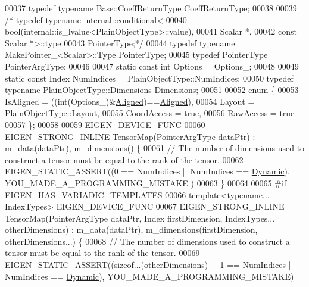 \begin{DoxyCode}
00037     \textcolor{keyword}{typedef} \textcolor{keyword}{typename} Base::CoeffReturnType CoeffReturnType;
00038 
00039   \textcolor{comment}{/*    typedef typename internal::conditional<}
00040 \textcolor{comment}{                         bool(internal::is\_lvalue<PlainObjectType>::value),}
00041 \textcolor{comment}{                         Scalar *,}
00042 \textcolor{comment}{                         const Scalar *>::type}
00043 \textcolor{comment}{                     PointerType;*/}
00044     \textcolor{keyword}{typedef} \textcolor{keyword}{typename} MakePointer\_<Scalar>::Type PointerType;
00045     \textcolor{keyword}{typedef} PointerType PointerArgType;
00046 
00047     \textcolor{keyword}{static} \textcolor{keyword}{const} \textcolor{keywordtype}{int} Options = Options\_;
00048 
00049     \textcolor{keyword}{static} \textcolor{keyword}{const} Index NumIndices = PlainObjectType::NumIndices;
00050     \textcolor{keyword}{typedef} \textcolor{keyword}{typename} PlainObjectType::Dimensions Dimensions;
00051 
00052     \textcolor{keyword}{enum} \{
00053       IsAligned = ((int(Options\_)&\hyperlink{group__enums_gga45fe06e29902b7a2773de05ba27b47a1ad37d4c71425bb286e9b4103830538fbf}{Aligned})==\hyperlink{group__enums_gga45fe06e29902b7a2773de05ba27b47a1ad37d4c71425bb286e9b4103830538fbf}{Aligned}),
00054       Layout = PlainObjectType::Layout,
00055       CoordAccess = \textcolor{keyword}{true},
00056       RawAccess = \textcolor{keyword}{true}
00057     \};
00058 
00059     EIGEN\_DEVICE\_FUNC
00060     EIGEN\_STRONG\_INLINE TensorMap(PointerArgType dataPtr) : m\_data(dataPtr), m\_dimensions() \{
00061       \textcolor{comment}{// The number of dimensions used to construct a tensor must be equal to the rank of the tensor.}
00062       EIGEN\_STATIC\_ASSERT((0 == NumIndices || NumIndices == \hyperlink{namespace_eigen_ad81fa7195215a0ce30017dfac309f0b2}{Dynamic}), YOU\_MADE\_A\_PROGRAMMING\_MISTAKE
      )
00063     \}
00064 
00065 \textcolor{preprocessor}{#if EIGEN\_HAS\_VARIADIC\_TEMPLATES}
00066     \textcolor{keyword}{template}<\textcolor{keyword}{typename}... IndexTypes> EIGEN\_DEVICE\_FUNC
00067     EIGEN\_STRONG\_INLINE TensorMap(PointerArgType dataPtr, Index firstDimension, IndexTypes... 
      otherDimensions) : m\_data(dataPtr), m\_dimensions(firstDimension, otherDimensions...) \{
00068       \textcolor{comment}{// The number of dimensions used to construct a tensor must be equal to the rank of the tensor.}
00069       EIGEN\_STATIC\_ASSERT((\textcolor{keyword}{sizeof}...(otherDimensions) + 1 == NumIndices || NumIndices == 
      \hyperlink{namespace_eigen_ad81fa7195215a0ce30017dfac309f0b2}{Dynamic}), YOU\_MADE\_A\_PROGRAMMING\_MISTAKE)

\end{DoxyCode}
